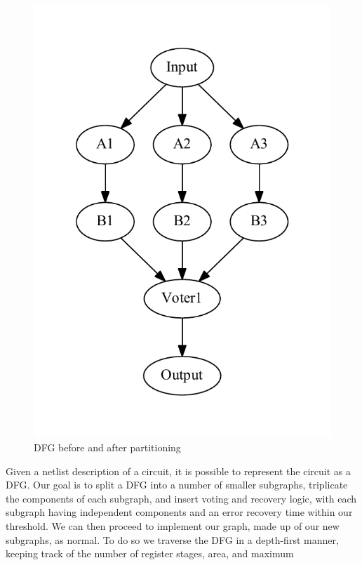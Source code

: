 \documentclass[12pt,final,oneside]{dwThesis} %
\begin{document}
\begin{figure}
\begin{center}
         \includegraphics[height=0.2\textheight]{images/TMR-post.pdf}
         \caption{\gls{DFG} before and after partitioning} \label{TMRFigure}

      \end{center}

   \end{figure}
   Given a netlist description of a circuit, it is
   possible to represent the circuit as a \gls{DFG}\cite{FPGAArch}. Our goal is
   to split a \gls{DFG} into a number of smaller subgraphs, triplicate the
   components of each subgraph, and insert voting and recovery logic, with each
   subgraph having independent components and an error recovery time within our
   threshold. We can then proceed to implement our graph, made up of our new
   subgraphs, as normal.  To do so we traverse the \gls{DFG} in a depth-first
   manner, keeping track of the number of register stages, area, and maximum
\end{document}
